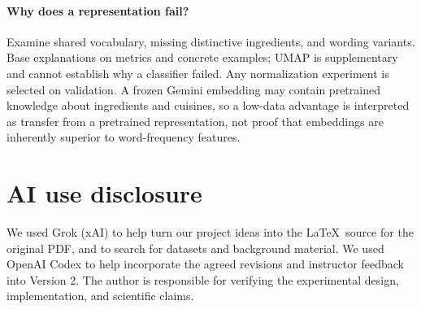 ﻿\documentclass[11pt,letterpaper]{article}
\begin{document}
\paragraph{Why does a representation fail?}
Examine shared vocabulary, missing distinctive ingredients, and wording variants. Base explanations on metrics and concrete examples; UMAP is supplementary and cannot establish why a classifier failed. Any normalization experiment is selected on validation. A frozen Gemini embedding may contain pretrained knowledge about ingredients and cuisines, so a low-data advantage is interpreted as transfer from a pretrained representation, not proof that embeddings are inherently superior to word-frequency features.

\section*{AI use disclosure}

We used Grok (xAI) to help turn our project ideas into the \LaTeX\ source for the original PDF, and to search for datasets and background material. We used OpenAI Codex to help incorporate the agreed revisions and instructor feedback into Version 2. The author is responsible for verifying the experimental design, implementation, and scientific claims.
\end{document}
